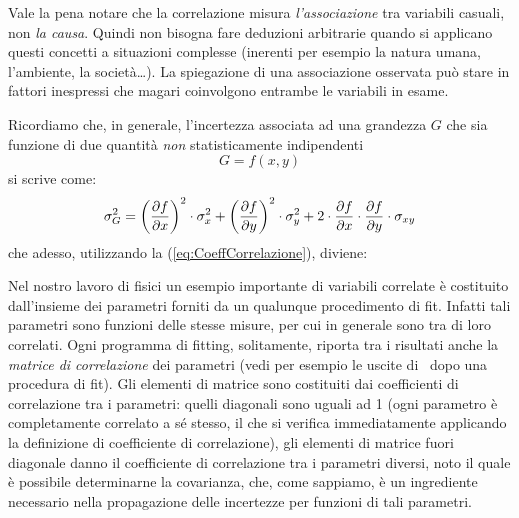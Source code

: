\begin{exemplify}


\end{exemplify}

Vale la pena notare che la correlazione misura {\em l'associazione} tra
variabili casuali, non  {\em  la causa}. Quindi non bisogna fare
deduzioni arbitrarie quando si applicano questi concetti a situazioni complesse
(inerenti per esempio la natura umana, l'ambiente, la
societ\`a\ldots). La spiegazione di una associazione osservata pu\`o stare in
fattori inespressi che magari coinvolgono entrambe le variabili in esame.

Ricordiamo che, in generale, l'incertezza associata ad una grandezza
$G$ che sia funzione di due quantit\`a {\itshape non} statisticamente
indipendenti
$$
G = f(x, y)
$$
si scrive come:
$$
\sigma_G^2 = \left( \displaystyle \frac{\partial f}{\partial x} \right)^2 \cdot \sigma_x^2+
\left( \displaystyle \frac{\partial f}{\partial y} \right)^2 \cdot \sigma_y^2 +
2\cdot \displaystyle \frac{\partial f}{\partial x} \cdot \displaystyle \frac{\partial f}{\partial y} \cdot \sigma_{xy}
$$
che adesso, utilizzando la (\ref{eq:CoeffCorrelazione}), diviene:

Nel nostro lavoro di fisici un esempio importante
di variabili correlate \`e costituito dall'insieme dei parametri forniti da un
qualunque procedimento di fit. Infatti tali parametri sono funzioni
delle stesse misure, per cui in generale sono tra di loro correlati.
Ogni programma di fitting, solitamente, riporta tra i risultati anche la
{\itshape matrice di correlazione} dei parametri (vedi per esempio le uscite
di \gnuplot\ dopo una procedura di fit). Gli elementi di matrice sono
costituiti dai coefficienti di correlazione tra i parametri: quelli diagonali
sono uguali ad 1 (ogni parametro \`e completamente correlato a s\'e stesso,
il che si verifica immediatamente applicando la definizione di
coefficiente di correlazione), gli elementi di matrice fuori diagonale
danno il coefficiente di correlazione tra i parametri diversi,
noto il quale \`e possibile determinarne la covarianza,
che, come sappiamo, \`e un ingrediente necessario nella propagazione delle
incertezze per funzioni di tali parametri.

